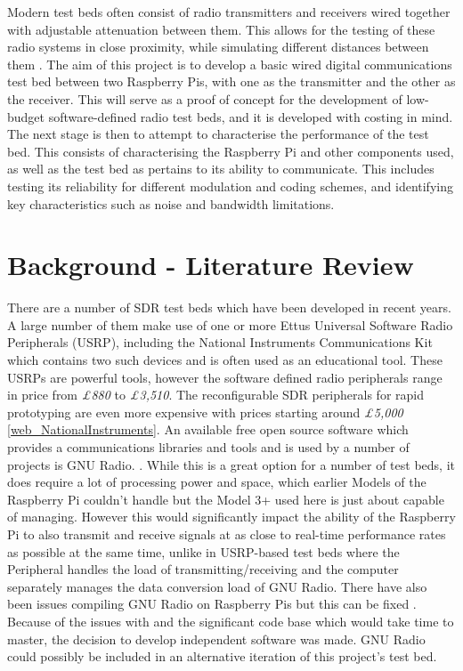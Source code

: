 \documentclass[../main.tex]{subfiles}
\begin{document}
Modern test beds often consist of radio transmitters and receivers wired together with adjustable attenuation between them.
This allows for the testing of these radio systems in close proximity, while simulating different distances between them \cite{pap_MilitaryRadioTB}.
The aim of this project is to develop a basic wired digital communications test bed between two Raspberry Pis, with one as the transmitter and the other as the receiver.
This will serve as a proof of concept for the development of low-budget software-defined radio test beds, and it is developed with costing in mind.
The next stage is then to attempt to characterise the performance of the test bed.
This consists of characterising the Raspberry Pi and other components used, as well as the test bed as pertains to its ability to communicate.
This includes testing its reliability for different modulation and coding schemes, and identifying key characteristics such as noise and bandwidth limitations.\\


\section{Background - Literature Review} \label{sec_Lit Review}

There are a number of SDR test beds which have been developed in recent years.
A large number of them make use of one or more Ettus Universal Software Radio Peripherals (USRP), including the National Instruments Communications Kit which contains two such devices and is often used as an educational tool.
These USRPs are powerful tools, however the software defined radio peripherals range in price from \textit{£880} to \textit{£3,510}.
The reconfigurable SDR peripherals for rapid prototyping are even more expensive with prices starting around \textit{£5,000} \ref{web_NationalInstruments}.
An available free open source software which provides a communications libraries and tools and is used by a number of projects is GNU Radio. \cite{web_GNURadio:http://garethhayes.net/gnu-radio-rtl_sdr-raspberry-pi/}.
While this is a great option for a number of test beds, it does require a lot of processing power and space, which earlier Models of the Raspberry Pi couldn't handle but the Model 3+ used here is just about capable of managing.
However this would significantly impact the ability of the Raspberry Pi to also transmit and receive signals at as close to real-time performance rates as possible at the same time, unlike in USRP-based test beds where the Peripheral handles the load of transmitting/receiving and the computer separately manages the data conversion load of GNU Radio.
There have also been issues compiling GNU Radio on Raspberry Pis but this can be fixed \cite{web_GNUonRPi:http://garethhayes.net/gnu-radio-rtl_sdr-raspberry-pi/}.
Because of the issues with and the significant code base which would take time to master, the decision to develop independent software was made.
GNU Radio could possibly be included in an alternative iteration of this project's test bed.\\
\end{document}
